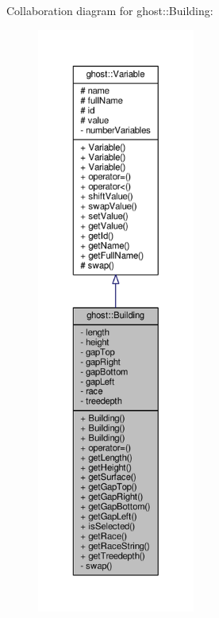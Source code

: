 Collaboration diagram for ghost\-:\-:Building\-:
\nopagebreak
\begin{figure}[H]
\begin{center}
\leavevmode
\includegraphics[height=550pt]{classghost_1_1Building__coll__graph}
\end{center}
\end{figure}

